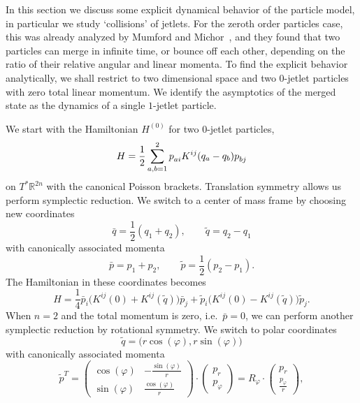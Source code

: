 \documentclass[12pt]{amsart}
\newcommand{\R}{\ensuremath{\mathbb{R}}}
\begin{document}
In this section we discuss some explicit dynamical behavior of the
particle model, in particular we study `collisions' of jetlets. For
the zeroth order particles case, this was already analyzed by Mumford
and Michor~\cite{MumfordMichor2013}, and they found that two
particles can merge in infinite time, or bounce off each other,
depending on the ratio of their relative angular and linear momenta.
To find the explicit behavior analytically, we shall restrict to two
dimensional space and two $0$-jetlet particles with zero total linear
momentum. We identify the asymptotics of the merged state as the
dynamics of a single $1$-jetlet particle.

We start with the Hamiltonian $H^{(0)}$ for two $0$-jetlet particles,
\begin{equation}\label{eq:H-two-0jetlets}
  H = \frac{1}{2} \sum_{a,b=1}^2 p\indices{_a_i} K^{ij}(q_a - q_b) p\indices{_b_j}
\end{equation}
on $T^* \R^{2n}$ with the canonical Poisson brackets.
Translation symmetry allows us perform symplectic reduction. We switch
to a center of mass frame by choosing new coordinates
\begin{equation}\label{eq:CoM-coords}
  \bar{q} = \frac{1}{2}(q_1 + q_2), \qquad \tilde{q} = q_2 - q_1
\end{equation}
with canonically associated momenta
\begin{equation*}
  \bar{p} = p_1 + p_2, \qquad \tilde{p} = \frac{1}{2}(p_2 - p_1).
\end{equation*}
The Hamiltonian in these coordinates becomes
\begin{equation*}
  H = \frac{1}{4} \bar{p}_i \big( K^{ij}(0) + K^{ij}(\tilde{q}) \big)   \bar{p}_j
              + \tilde{p}_i \big( K^{ij}(0) - K^{ij}(\tilde{q}) \big) \tilde{p}_j.
\end{equation*}
When $n = 2$ and the total momentum is zero, i.e.~$\bar{p} = 0$, we can perform
another symplectic reduction by rotational symmetry. We switch to
polar coordinates
\begin{equation}\label{eq:polar-coords}
  \tilde{q} = \big(r\cos(\varphi),r\sin(\varphi)\big)
\end{equation}
with canonically associated momenta
\begin{equation*}
  \tilde{p}^T =
  \begin{pmatrix}
    \cos(\varphi) & -\frac{\sin(\varphi)}{r} \\
    \sin(\varphi) &  \frac{\cos(\varphi)}{r}
  \end{pmatrix} \cdot
  \begin{pmatrix}
    p_r \\
    p_\varphi
  \end{pmatrix}
  = R_\varphi \cdot
  \begin{pmatrix}
    p_r \\
    \frac{p_\varphi}{r}
  \end{pmatrix},
\end{equation*}
\end{document}
